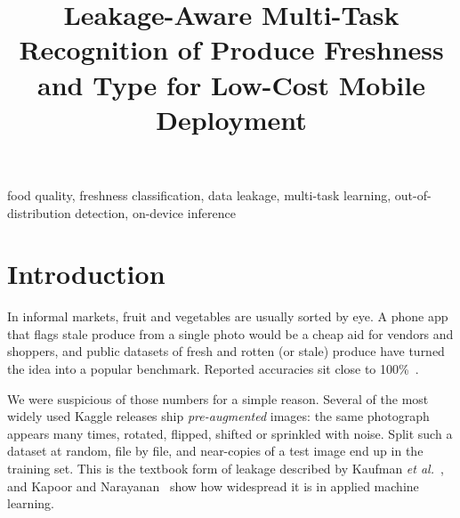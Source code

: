 \documentclass[conference]{IEEEtran}
\begin{document}
\title{Leakage-Aware Multi-Task Recognition of Produce Freshness and Type for Low-Cost Mobile Deployment}

\author{
\and
{}
\and
{}
\and
{}
}

\maketitle

\begin{abstract}

\end{abstract}

\begin{IEEEkeywords}
food quality, freshness classification, data leakage, multi-task learning,
out-of-distribution detection, on-device inference
\end{IEEEkeywords}

\section{Introduction}
In informal markets, fruit and vegetables are usually sorted by eye. A phone
app that flags stale produce from a single photo would be a cheap aid for
vendors and shoppers, and public datasets of fresh and rotten (or stale)
produce have turned the idea into a popular benchmark. Reported accuracies sit
close to 100\%~\cite{noisyvit2025}.

We were suspicious of those numbers for a simple reason. Several of the most
widely used Kaggle releases ship \emph{pre-augmented} images: the same
photograph appears many times, rotated, flipped, shifted or sprinkled with
noise. Split such a dataset at random, file by file, and near-copies of a test
image end up in the training set. This is the textbook form of leakage
described by Kaufman \emph{et al.}~\cite{kaufman2012leakage}, and Kapoor and
Narayanan~\cite{kapoor2023leakage} show how widespread it is in applied
machine learning.
\end{document}
